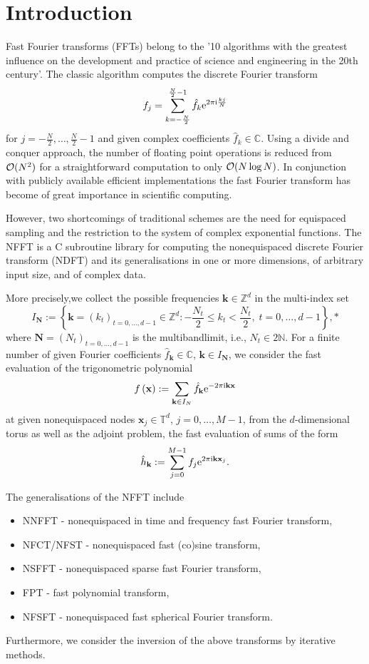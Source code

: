 \hypertarget{index_section_intro_sec}{}\section{Introduction}\label{index_section_intro_sec}
Fast Fourier transforms (FFTs) belong to the '10 algorithms with the greatest influence on the development and practice of science and engineering in the 20th century'. The classic algorithm computes the discrete Fourier transform \[ f_j= \sum_{k=-\frac{N}{2}}^{\frac{N}{2}-1} \hat{f}_{k} {\rm e}^{2\pi{\rm i}\frac{kj}{N}} \] for $j=-\frac{N}{2},\hdots,\frac{N}{2}-1$ and given complex coefficients $\hat{f}_{k}\in\mathbb{C}$. Using a divide and conquer approach, the number of floating point operations is reduced from ${\cal O}(N^2)$ for a straightforward computation to only ${\cal O}(N\log N)$. In conjunction with publicly available efficient implementations the fast Fourier transform has become of great importance in scientific computing.

However, two shortcomings of traditional schemes are the need for equispaced sampling and the restriction to the system of complex exponential functions. The NFFT is a C subroutine library for computing the nonequispaced discrete Fourier transform (NDFT) and its generalisations in one or more dimensions, of arbitrary input size, and of complex data.

More precisely,we collect the possible frequencies $\mathbf{k}\in\mathbb{Z}^d$ in the multi-index set \[ I_{\mathbf{N}} := \left\{ \mathbf{k}=\left(k_t\right)_{t=0,\hdots,d-1} \in \mathbb{Z}^d: - \frac{N_t}{2} \le k_t < \frac{N_t}{2} ,\;t=0,\hdots,d-1\right\}, *\] where $\mathbf{N}=\left(N_t\right)_{t=0,\hdots,d-1}$ is the multibandlimit, i.e., $N_t\in 2\mathbb{N}$. For a finite number of given Fourier coefficients $\hat f_{\mathbf{k}} \in \mathbb{C}$, $\mathbf{k}\in I_{\mathbf{N}}$, we consider the fast evaluation of the trigonometric polynomial \[ f\left(\mathbf{x}\right) := \sum_{ \mathbf{k}\in I_{ N}} \hat{f}_{\mathbf{ k}} {\rm e}^{-2\pi{\rm i}\mathbf{k}\mathbf{ x}} \] at given nonequispaced nodes $\mathbf{x}_j \in \mathbb{T}^d$, $j=0,\ldots, M-1$, from the $ d$-dimensional torus as well as the adjoint problem, the fast evaluation of sums of the form \[ \hat h_{\mathbf{k}} := \sum_{j=0}^{M-1} {f}_{j} {\rm e}^{2\pi{\rm i}\mathbf{k}\mathbf{ x}_j}. \]

The generalisations of the NFFT include\begin{itemize}
\item NNFFT - nonequispaced in time and frequency fast Fourier transform,\item NFCT/NFST - nonequispaced fast (co)sine transform,\item NSFFT - nonequispaced sparse fast Fourier transform,\item FPT - fast polynomial transform,\item NFSFT - nonequispaced fast spherical Fourier transform.\end{itemize}


Furthermore, we consider the inversion of the above transforms by iterative methods. 
